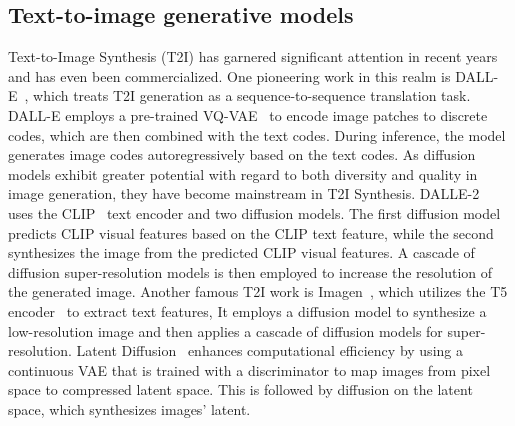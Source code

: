 \documentclass{article}
\begin{document}
\subsection{Text-to-image generative models}
Text-to-Image Synthesis (T2I) has garnered significant attention in recent years and has even been commercialized. One pioneering work in this realm is DALL-E~\cite{ramesh2021zero}, which treats T2I generation as a sequence-to-sequence translation task. DALL-E employs a pre-trained VQ-VAE~\cite{van2017neural} to encode image patches to discrete codes, which are then combined with the text codes. During inference, the model generates image codes autoregressively based on the text codes. As diffusion models exhibit greater potential with regard to both diversity and quality in image generation, they have become mainstream in T2I Synthesis. DALLE-2~\cite{ramesh2022hierarchical} uses the CLIP~\cite{radford2021learning} text encoder and two diffusion models. The first diffusion model predicts CLIP visual features based on the CLIP text feature, while the second synthesizes the image from the predicted CLIP visual features. A cascade of diffusion super-resolution models is then employed to increase the resolution of the generated image. Another famous T2I work is Imagen~\cite{saharia2022photorealistic}, which utilizes the T5 encoder~\cite{raffel2020exploring} to extract text features, It employs a diffusion model to synthesize a low-resolution image and then applies a cascade of diffusion models for super-resolution. Latent Diffusion~\cite{rombach2022high} enhances computational efficiency by using a continuous VAE that is trained with a discriminator to map images from pixel space to compressed latent space. This is followed by diffusion on the latent space, which synthesizes images' latent.
\end{document}
